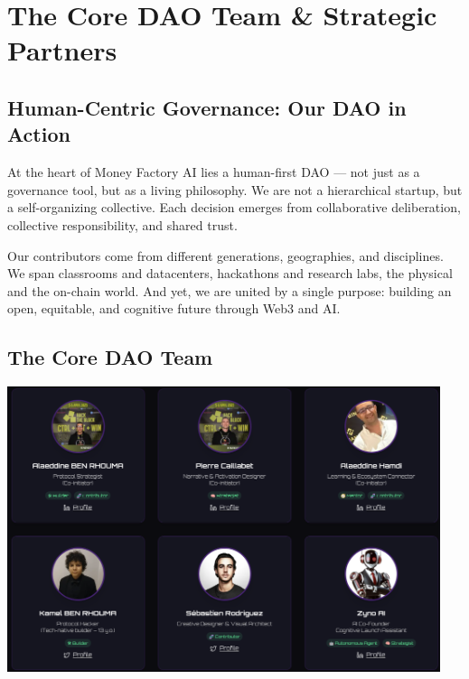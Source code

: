 \section{The Core DAO Team \& Strategic Partners}

\subsection{Human-Centric Governance: Our DAO in Action}

At the heart of Money Factory AI lies a human-first DAO — not just as a governance tool, but as a living philosophy. We are not a hierarchical startup, but a self-organizing collective. Each decision emerges from collaborative deliberation, collective responsibility, and shared trust. 

Our contributors come from different generations, geographies, and disciplines. We span classrooms and datacenters, hackathons and research labs, the physical and the on-chain world. And yet, we are united by a single purpose: building an open, equitable, and cognitive future through Web3 and AI.

\vspace{0.5cm}
\subsection*{The Core DAO Team}

\begin{center}
  \includegraphics[width=0.95\textwidth]{images/team.png}
\end{center}

